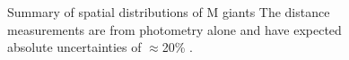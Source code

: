\documentclass[galaxies,article,submit,moreauthors,pdftex,10pt,a4paper]{mdpi}
\newcommand{\survey}[1]{\textsl{#1}}
\begin{document}

\begin{figure}[t]
\label{fig:ting}
\centering
\caption{\label{fig:ting}
Summary of spatial distributions of M giants
The distance measurements are from photometry alone and have expected absolute uncertainties of $\approx$20\% \citep{sheffield14}.
}
\end{figure}
\end{document}
